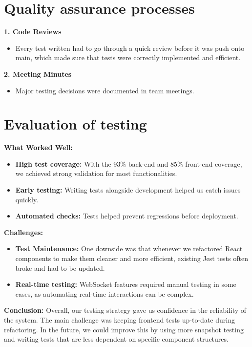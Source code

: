\section{Quality assurance processes}
\label{sect:testing:process}
\textbf{1. Code Reviews}
    \begin{itemize}
        \item Every test written had to go through a quick review before it was push onto main, which made sure that tests were correctly implemented and efficient.
    \end{itemize}
\textbf{2. Meeting Minutes}
    \begin{itemize}
        \item Major testing decisions were documented in team meetings.
    \end{itemize}

\section{Evaluation of testing}
\label{sect:testing:evaluation}
\textbf{What Worked Well:}
\begin{itemize}
    \item \textbf{High test coverage:} With the 93\% back-end and 85\% front-end coverage, we achieved strong validation for most functionalities.
    \item \textbf{Early testing:} Writing tests alongside development helped us catch issues quickly.
    \item \textbf{Automated checks:} Tests helped prevent regressions before deployment.
\end{itemize}

\textbf{Challenges:}
\begin{itemize}
    \item \textbf{Test Maintenance:} One downside was that whenever we refactored React components to make them cleaner and more efficient, existing Jest tests often broke and had to be updated.
    \item \textbf{Real-time testing:} WebSocket features required manual testing in some cases, as automating real-time interactions can be complex.
\end{itemize}

\textbf{Conclusion:}  
Overall, our testing strategy gave us confidence in the reliability of the system. The main challenge was keeping frontend tests up-to-date during refactoring. In the future, we could improve this by using more snapshot testing and writing tests that are less dependent on specific component structures.
